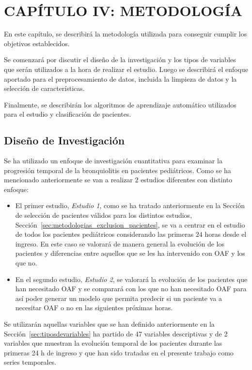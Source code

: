 \section{CAPÍTULO IV: METODOLOGÍA}\label{sec:methodology}

En este capítulo, se describirá la metodología utilizada para conseguir cumplir los objetivos establecidos. 

Se comenzará por discutir el diseño de la investigación y los tipos de variables que serán utilizados a la hora de realizar el estudio. Luego se describirá el enfoque aportado para el preprocesamiento de datos, incluida la limpieza de datos y la selección de características.

Finalmente, se describirán los algoritmos de aprendizaje automático utilizados para el estudio y clasificación de pacientes. 

\subsection{Diseño de Investigación}

Se ha utilizado un enfoque de investigación cuantitativa para examinar la progresión temporal de la bronquiolitis en pacientes pediátricos. Como se ha mencionado anteriormente se van a realizar $2$ estudios diferentes con distinto enfoque:

\begin{itemize}
    \item El primer estudio, \textit{Estudio 1}, como se ha tratado anteriormente en la Sección de selección de pacientes válidos para los distintos estudios, Sección~\ref{sec:metodologias_exclusion_pacientes}, se va a centrar en el estudio de todos los pacientes pediátricos considerando las primeras $24$ horas desde el ingreso. En este caso se valorará de manera general la evolución de los pacientes y diferencias entre aquellos que se les ha intervenido con OAF y los que no.
    \item  En el segundo estudio, \textit{Estudio 2}, se valorará la evolución de los pacientes que han necesitado OAF y se comparará con los que no han necesitado OAF para así poder generar un modelo que permita predecir si un paciente va a necesitar OAF o no en las siguientes próximas horas.
\end{itemize}


Se utilizarán aquellas variables que se han definido anteriormente en la Sección~\ref{sec:tiposdevariables} ha partido de 47 variables descriptivas y de 2 variables que muestran la evolución temporal de los pacientes durante las primeras 24 h de ingreso y que han sido tratadas en el presente trabajo como series temporales. 

